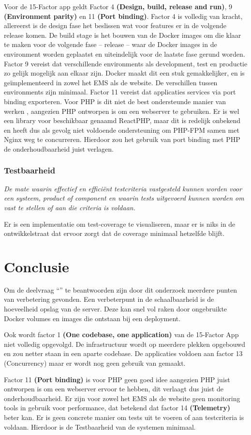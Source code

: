 Voor de 15-Factor app geldt Factor 4 \textbf{(Design, build, release and run)}, 9 \textbf{(Environment parity)} en 11 \textbf{(Port binding)}. Factor 4 is volledig van kracht, allereerst is de design fase het beslissen wat voor features er in de volgende release komen. De build stage is het bouwen van de Docker images om die klaar te maken voor de volgende fase -- release -- waar de Docker images in de environment worden geplaatst en uiteindelijk voor de laatste fase gerund worden. Factor 9 vereist dat verschillende environments als development, test en productie zo gelijk mogelijk aan elkaar zijn. Docker maakt dit een stuk gemakkelijker, en is geïmplementeerd in zowel het EMS als de website. De verschillen tussen environments zijn minimaal. Factor 11 vereist dat applicaties services via port binding exporteren. Voor PHP is dit niet de best ondersteunde manier van werken \parencite{PortBinding1, PortBinding2, PortBinding3}, aangezien PHP ontworpen is om een webserver te gebruiken. Er is wel een library voor beschikbaar genaamd ReactPHP, maar dit is redelijk onbekend en heeft dus als gevolg niet voldoende ondersteuning om PHP-FPM samen met Nginx weg te concurreren. Hierdoor zou het gebruik van port binding met PHP de onderhoudbaarheid juist verlagen.

\subsubsection{Testbaarheid}
\textit{De mate waarin effectief en efficiënt testcriteria vastgesteld kunnen worden voor een systeem, product of component en waarin tests uitgevoerd kunnen worden om vast te stellen of aan die criteria is voldaan.}

Er is een implementatie om test-coverage te visualiseren, maar er is niks in de ontwikkelstraat dat ervoor zorgt dat de coverage minimaal hetzelfde blijft. 

\section{Conclusie}
Om de deelvraag \enquote{\deelhuidig} te beantwoorden zijn door dit onderzoek meerdere punten van verbetering gevonden. Een verbeterpunt in de schaalbaarheid is de hoeveelheid opslag van de server. Deze kan snel vol raken door ongebruikte Docker volumes en images die ontstaan bij een deployment. 

Ook wordt factor 1 \textbf{(One codebase, one application)} van de 15-Factor App niet volledig opgevolgd. De infrastructuur wordt op meerdere plekken opgebouwd en zou netter staan in een aparte codebase. De applicaties voldoen aan factor 13 (Concurrency) maar er wordt nog geen gebruik van gemaakt. 

Factor 11 \textbf{(Port binding)} is voor PHP geen goed idee aangezien PHP juist ontworpen is om een webserver ervoor te hebben, dit verlaagt dus juist de onderhoudbaarheid. Er zijn voor zowel het EMS als de website geen monitoring tools in gebruik voor performance, dat betekend dat factor 14 \textbf{(Telemetry)} beter kan. Er is geen concrete manier om tests uit te voeren of aan testcriteria is voldaan. Hierdoor is de Testbaarheid van de systemen minimaal.